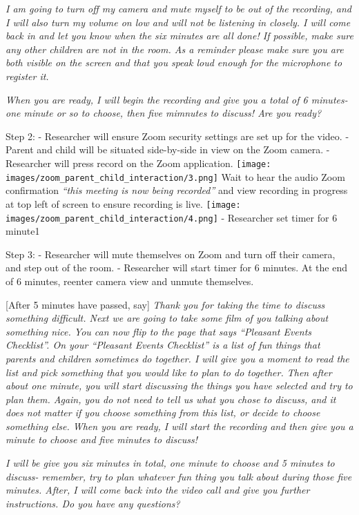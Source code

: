\documentclass[
]{book}
\begin{document}
\emph{I am going to turn off my camera and mute myself to be out of the recording, and I will also turn my volume on low and will not be listening in closely. I will come back in and let you know when the six minutes are all done! If possible, make sure any other children are not in the room. As a reminder please make sure you are both visible on the screen and that you speak loud enough for the microphone to register it.}

\emph{When you are ready, I will begin the recording and give you a total of 6 minutes- one minute or so to choose, then five mimnutes to discuss! Are you ready?}

Step 2:
- Researcher will ensure Zoom security settings are set up for the video.
- Parent and child will be situated side-by-side in view on the Zoom camera.
-Researcher will press record on the Zoom application. \texttt{[image: images/zoom\_parent\_child\_interaction/3.png]} Wait to hear the audio Zoom confirmation \emph{``this meeting is now being recorded''} and view recording in progress at top left of screen to ensure recording is live. \texttt{[image: images/zoom\_parent\_child\_interaction/4.png]}
- Researcher set timer for 6 minute1

Step 3:
- Researcher will mute themselves on Zoom and turn off their camera, and step out of the room.
- Researcher will start timer for 6 minutes. At the end of 6 minutes, reenter camera view and unmute themselves.

{[}After 5 minutes have passed, say{]} \emph{Thank you for taking the time to discuss something difficult. Next we are going to take some film of you talking about something nice. You can now flip to the page that says ``Pleasant Events Checklist''. On your ``Pleasant Events Checklist'' is a list of fun things that parents and children sometimes do together. I will give you a moment to read the list and pick something that you would like to plan to do together. Then after about one minute, you will start discussing the things you have selected and try to plan them. Again, you do not need to tell us what you chose to discuss, and it does not matter if you choose something from this list, or decide to choose something else. When you are ready, I will start the recording and then give you a minute to choose and five minutes to discuss!}

\emph{I will be give you six minutes in total, one minute to choose and 5 minutes to discuss- remember, try to plan whatever fun thing you talk about during those five minutes. After, I will come back into the video call and give you further instructions. Do you have any questions?}
\end{document}
